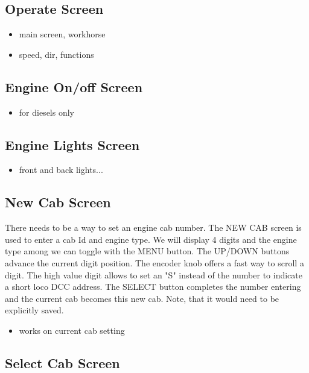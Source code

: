 \subsection{Operate Screen}

\begin{itemize}
\item main screen, workhorse
\item speed, dir, functions
\end{itemize}

\subsection{Engine On/off Screen}

\begin{itemize}
\item for diesels only
\end{itemize}

\subsection{Engine Lights Screen}

\begin{itemize}
\item front and back lights...
\end{itemize}

\subsection{New Cab Screen}

There needs to be a way to set an engine cab number. The NEW CAB screen is used to enter a cab Id and engine type. We will display 4 digits and the engine type among we can toggle with the MENU button. The UP/DOWN buttons advance the current digit position. The encoder knob offers a fast way to scroll a digit. The high value digit allows to set an "S" instead of the number to indicate a short loco DCC address. The SELECT button completes the number entering and the current cab becomes this new cab. Note, that it would need to be explicitly saved.

\begin{itemize}
\item works on current cab setting
\end{itemize}

\subsection{Select Cab Screen}

